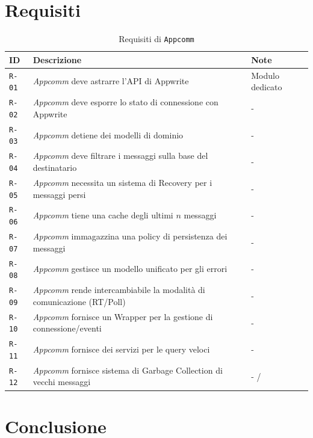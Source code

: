 \documentclass[a4paper, 11pt, twoside]{report}
\begin{document}
\section{Requisiti}
\begin{table}[h]
\centering
\begin{tabular}{@{}lp{11cm}l@{}}
\toprule
\textbf{ID}   & \textbf{Descrizione}                                                          & \textbf{Note}   \\ \midrule
\texttt{R-01} & \textit{Appcomm} deve astrarre l'API di Appwrite                              & Modulo dedicato \\
\texttt{R-02} & \textit{Appcomm} deve esporre lo stato di connessione con Appwrite            & -               \\
\texttt{R-03} & \textit{Appcomm} detiene dei modelli di dominio                               & -               \\
\texttt{R-04} & \textit{Appcomm} deve filtrare i messaggi sulla base del destinatario         & -               \\
\texttt{R-05} & \textit{Appcomm} necessita un sistema di Recovery per i messaggi persi        & -               \\
\texttt{R-06} & \textit{Appcomm} tiene una cache degli ultimi $n$ messaggi                    & -               \\
\texttt{R-07} & \textit{Appcomm} immagazzina una policy di persistenza dei messaggi           & -               \\
\texttt{R-08} & \textit{Appcomm} gestisce un modello unificato per gli errori                 & -               \\
\texttt{R-09} & \textit{Appcomm} rende intercambiabile la modalità di comunicazione (RT/Poll) & -               \\
\texttt{R-10} & \textit{Appcomm} fornisce un Wrapper per la gestione di connessione/eventi    & -               \\
\texttt{R-11} & \textit{Appcomm} fornisce dei servizi per le query veloci                     & -               \\
\texttt{R-12} & \textit{Appcomm} fornisce sistema di Garbage Collection di vecchi messaggi    & -               /\\
\bottomrule
\end{tabular}
\caption{Requisiti di \texttt{Appcomm}}
\end{table}

\section{Conclusione}
\end{document}
